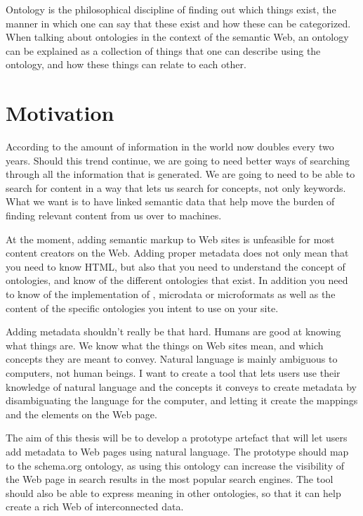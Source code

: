 Ontology is the philosophical discipline of finding out which things exist,
the manner in which one can say that these exist and how these can be categorized.
When talking about ontologies in the context of the semantic Web,
an ontology can be explained as a collection of things that one can describe using the ontology,
and how these things can relate to each other.


\section{Motivation}
According to \citet{Gantz2011} the amount of information in the world now doubles every two years.
Should this trend continue, we are going to need better ways of searching through all the information that is generated.
We are going to need to be able to search for content in a way that lets us search for concepts, not only keywords.
What we want is to have linked semantic data that help move the burden of finding relevant content from us over to machines.

At the moment, adding semantic markup to Web sites is unfeasible for most content creators on the Web.
Adding proper metadata does not only mean that you need to know HTML,
but also that you need to understand the concept of ontologies, and know of the different ontologies that exist.
In addition you need to know of the implementation of , microdata or microformats
as well as the content of the specific ontologies you intent to use on your site.

Adding metadata shouldn't really be that hard.
Humans are good at knowing what things are.
We know what the things on Web sites mean, and which concepts they are meant to convey.
Natural language is mainly ambiguous to computers, not human beings.
I want to create a tool that lets users use their knowledge of natural language and the concepts it conveys
to create metadata by disambiguating the language for the computer, and letting it create the mappings and the elements on the Web page.

The aim of this thesis will be to develop a prototype artefact that will let users add metadata to Web pages using natural language.
The prototype should map to the schema.org ontology,
as using this ontology can increase the visibility of the Web page in search results in the most popular search engines.
The tool should also be able to express meaning in other ontologies, so that it can help create a rich Web of interconnected data.

